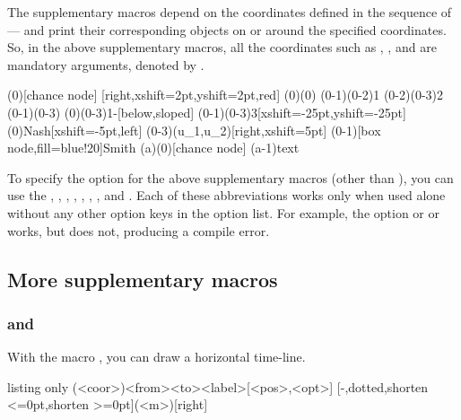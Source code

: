 The supplementary macros depend on the coordinates defined 
in the sequence of \cmd{\istroot}--\cmd{\istb}--\cmd{\endist} 
and print their corresponding objects on or around the specified coordinates.
So, in the above supplementary macros, all the coordinates such as , , 
and  are mandatory arguments, denoted by .

\begin{tcblisting}{}
\begin{istgame}[scale=1.5]
\istroot(0)[chance node]
    \istb*
  [right,xshift=2pt,yshift=2pt,red]  \endist
\xtInfosetO(0)(0)
\xtInfoset[thick](0-1)(0-2){1}
\xtInfosetO[thick,red,rounded corners=.5em](0-2)(0-3){2}
\xtInfoset[dashed,bend right=25](0-1)(0-3)
\xtActionLabel(0)(0-3){1-\epsilon}[below,sloped] %
\xtInfosetOwner(0-1)(0-3){3}[xshift=-25pt,yshift=-25pt]
\xtOwner(0){Nash}[xshift=-5pt,left]
\xtPayoff(0-3){(u_1,u_2)}[right,xshift=5pt] %
\xtNode[dotted](0-1)[box node,fill=blue!20]{Smith}
\istroot[east](a)(0)[chance node]  \istb \endist
\xtNode*(a-1){text}
\end{istgame}
\end{tcblisting}


To specify the \xw{[<pos>]} option for the above supplementary macros (other than \cmd{\xtNode}), 
you can use the  
\xw{[l]}, \xw{[r]}, \xw{[a]}, \xw{[b]}, \xw{[al]}, \xw{[ar]}, \xw{[bl]}, and \xw{[br]}.
Each of these abbreviations works only when used alone without any other option keys in the option list.
For example, the option \xw{[b]} or \xw{[below]} or \xw{[below,xshift=5pt]} works, but \xw{[b,xshift=5pt]} does not,  producing a compile error.

\subsection{More supplementary macros}

\subsubsection{\protect\cmd{\xtTimeLineH} and \protect\cmd{\xtTimeLineV}}

With the macro \icmd{\xtTimeLineH}, you can draw a horizontal time-line.

\begin{tcblisting}{listing only}
  \xtTimeLineH[<opt>](<coor>){<from>}{<to>}{<label>}[<pos>,<opt>]
  [-,dotted,shorten <=0pt,shorten >=0pt](<m>){}{}[right]
\end{tcblisting}

